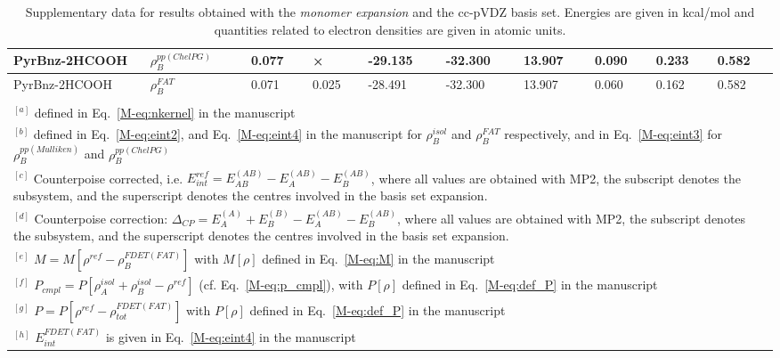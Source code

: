 \documentclass[amsmath,amssymb,preprint,aip,jcp]{revtex4-1}
\begin{document}
\begin{table}[H]
\begin{center}
{\begin{tabular}{|l|l|l|l|l|l|l|l|l|l|}
PyrBnz-2HCOOH & $\rho_B^{pp(ChelPG)}$ & 0.077 & × & -29.135 & -32.300 & 13.907 & 0.090 & 0.233 & 0.582\\\hline
PyrBnz-2HCOOH & $\rho_B^{FAT}$ & 0.071 & 0.025 & -28.491 & -32.300 & 13.907 & 0.060 & 0.162 & 0.582\\\hline
\multicolumn{10}{c}{ } \\
\multicolumn{10}{p{1.0\textwidth}}{$^{[a]}$ defined in Eq.~\ref{M-eq:nkernel} in the manuscript}\\
\multicolumn{10}{p{1.0\textwidth}}{$^{[b]}$ defined in Eq.~\ref{M-eq:eint2}, and Eq.~\ref{M-eq:eint4} in the manuscript for $\rho_B^{isol}$ and $\rho_B^{FAT }$ respectively, and in Eq.~\ref{M-eq:eint3} for $\rho_B^{pp(Mulliken)}$ and $\rho_B^{pp(ChelPG)}$}\\
\multicolumn{10}{p{1.0\textwidth}}{$^{[c]}$ Counterpoise corrected, i.e. $E_{int}^{ref} = E_{AB}^{(AB)} - E_{A}^{(AB)} - E_{B}^{(AB)}$, where all values are obtained with MP2, the subscript denotes the subsystem, and the superscript denotes the centres involved in the basis set expansion.} \\
\multicolumn{10}{p{1.0\textwidth}}{$^{[d]}$ Counterpoise correction: $\Delta_{CP} = E_{A}^{(A)} + E_{B}^{(B)} - E_{A}^{(AB)} - E_{B}^{(AB)}$, where all values are obtained with MP2, the subscript denotes the subsystem, and the superscript denotes the centres involved in the basis set expansion.} \\
\multicolumn{10}{p{1.0\textwidth}}{$^{[e]}$ $M=M[\rho^{ref} - \rho^{FDET(FAT)}_{B}]$ with $M[\rho]$ defined in Eq.~\ref{M-eq:M} in the manuscript}\\
\multicolumn{10}{p{1.0\textwidth}}{$^{[f]}$ $P_{cmpl}=P[\rho_A^{isol}+\rho_B^{isol} - \rho^{ref}]$ (cf. Eq.~\ref{M-eq:p_cmpl}), with $P[\rho]$ defined in Eq.~\ref{M-eq:def_P} in the manuscript}\\
\multicolumn{10}{p{1.0\textwidth}}{$^{[g]}$ $P=P[\rho^{ref} - \rho_{tot}^{FDET(FAT)}]$ with $P[\rho]$ defined in Eq.~\ref{M-eq:def_P} in the manuscript}\\
\multicolumn{10}{p{1.0\textwidth}}{$^{[h]}$ $E^{FDET(FAT)}_{int}$ is given in Eq.~\ref{M-eq:eint4} in the manuscript}\\
\end{tabular}
}
\end{center}
\caption{Supplementary data for results obtained with the \textit{monomer expansion} and the cc-pVDZ basis set. Energies are given in kcal/mol and quantities related to electron densities are given in atomic units.}
\end{table}
\end{document}
